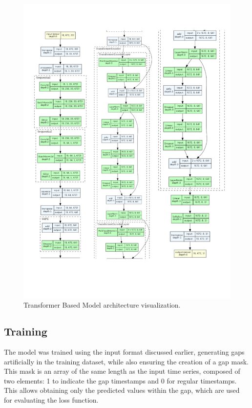 \begin{figure}[H]
	\centering
	\includegraphics[height=.94\textheight]{chapters/3_models/imgs/gab/transformerarchitecture.png}
	\caption{Transformer Based Model architecture visualization.}\label{fig:gabarchitecture}
\end{figure}

\subsection{Training}
The model was trained using the input format discussed earlier,
generating gaps artificially in the training dataset, while also ensuring the
creation of a gap mask.
This mask is an array of the same length as the input time series,
composed of two elements: 1 to indicate the gap timestamps and 0 for regular timestamps.
This allows obtaining only the predicted values within the gap,
which are used for evaluating the loss function.


